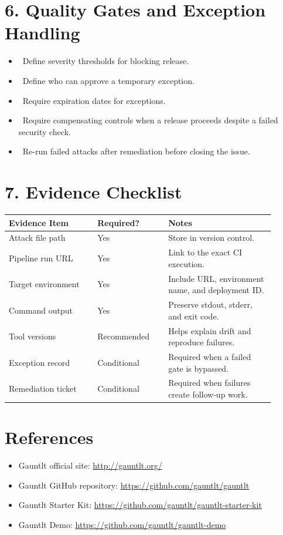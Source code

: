 \documentclass[11pt]{article}
\newcommand{\checkbox}{\raisebox{0.2ex}{\fbox{\rule{0pt}{0.9ex}\rule{0.9ex}{0pt}}}}
\begin{document}
\section{6. Quality Gates and Exception Handling}
\begin{itemize}
  \item \checkbox\ Define severity thresholds for blocking release.
  \item \checkbox\ Define who can approve a temporary exception.
  \item \checkbox\ Require expiration dates for exceptions.
  \item \checkbox\ Require compensating controls when a release proceeds despite a failed security check.
  \item \checkbox\ Re-run failed attacks after remediation before closing the issue.
\end{itemize}

\section{7. Evidence Checklist}
\begin{longtable}{@{}L{0.30\linewidth}L{0.24\linewidth}L{0.36\linewidth}@{}}
\toprule
\textbf{Evidence Item} & \textbf{Required?} & \textbf{Notes} \\
\midrule
Attack file path & Yes & Store in version control. \\
Pipeline run URL & Yes & Link to the exact CI execution. \\
Target environment & Yes & Include URL, environment name, and deployment ID. \\
Command output & Yes & Preserve stdout, stderr, and exit code. \\
Tool versions & Recommended & Helps explain drift and reproduce failures. \\
Exception record & Conditional & Required when a failed gate is bypassed. \\
Remediation ticket & Conditional & Required when failures create follow-up work. \\
\bottomrule
\end{longtable}


\section*{References}
\begin{itemize}
  \item Gauntlt official site: \url{http://gauntlt.org/}
  \item Gauntlt GitHub repository: \url{https://github.com/gauntlt/gauntlt}
  \item Gauntlt Starter Kit: \url{https://github.com/gauntlt/gauntlt-starter-kit}
  \item Gauntlt Demo: \url{https://github.com/gauntlt/gauntlt-demo}
\end{itemize}
\end{document}
